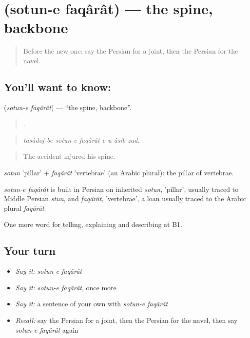 \section[\texorpdfstring{\fa{ستون} \fa{فقرات} (sotun-e faqârât)}{ستون فقرات (sotun-e faqârât)}]{  (sotun-e faqârât) — the spine, backbone}

\label{lesson:FA-C497-sotun-e-faqarat}



\begin{quote}
Before the new one: say the Persian for a joint, then the Persian for the navel.
\end{quote}

\subsection*{You'll want to know:  }
\textbf{ } (\emph{sotun-e faqârât}) — \textquotedblleft{}the spine, backbone\textquotedblright{}.

\begin{quote}
      .
\end{quote}

\begin{quote}
\emph{tasâdof be sotun-e faqârât-e u âsib zad.}
\end{quote}

\begin{quote}
The accident injured his spine.
\end{quote}

\emph{sotun} 'pillar' + \emph{faqârât} 'vertebrae' (an Arabic plural): the pillar of vertebrae.

\begin{cousinweb}
\emph{sotun-e faqârât} is built in Persian on inherited \emph{sotun}, 'pillar', usually traced to Middle Persian \emph{stūn}, and \emph{faqârât}, 'vertebrae', a loan usually traced to the Arabic plural \emph{faqārāt}.
\end{cousinweb}

\begin{grammarlens}[title={What you've built}]
One more word for telling, explaining and describing at B1.
\end{grammarlens}

\subsection*{Your turn}
\begin{itemize}
\raggedright
  \item \emph{Say it:} \emph{sotun-e faqârât}
  \item \emph{Say it:} \emph{sotun-e faqârât}, once more
  \item \emph{Say it:} a sentence of your own with \emph{sotun-e faqârât}
  \item \emph{Recall:} say the Persian for a joint, then the Persian for the navel, then say \emph{sotun-e faqârât} again
\end{itemize}

